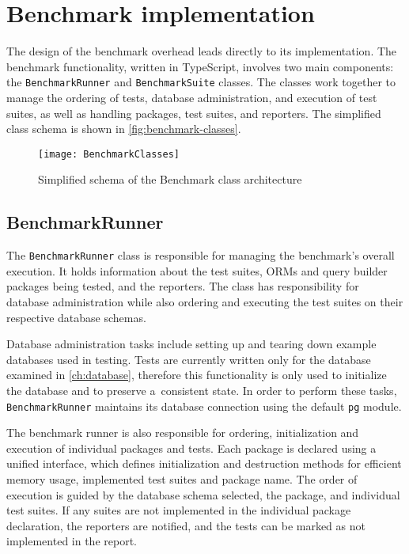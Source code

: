 \chapter{Benchmark implementation}\label{ch:BenchmarkImplement}

The design of the benchmark overhead leads directly to its implementation. The
benchmark functionality, written in TypeScript, involves two main components:
the \texttt{BenchmarkRunner} and \texttt{BenchmarkSuite} classes. The classes
work together to manage the ordering of tests, database administration, and
execution of test suites, as well as handling packages, test suites, and
reporters. The simplified class schema is shown in \autoref{fig:benchmark-classes}.

\begin{figure}[hp]
    \caption{Simplified schema of the Benchmark class architecture}
    \centering
    \label{fig:benchmark-classes}
    \texttt{[image: BenchmarkClasses]}
\end{figure}

\section{BenchmarkRunner}

The \texttt{BenchmarkRunner} class is responsible for managing the benchmark’s
overall execution. It holds information about the test suites, ORMs and query
builder packages being tested, and the reporters. The class has responsibility
for database administration while also ordering and executing the test suites on
their respective database schemas.

Database administration tasks include setting up and tearing down example
databases used in testing. Tests are currently written only for the database
examined in \autoref{ch:database}, therefore this functionality is only used to
initialize the database and to preserve a~consistent state. In order to perform
these tasks, \texttt{BenchmarkRunner} maintains its database connection using
the default \texttt{pg} module.

The benchmark runner is also responsible for ordering, initialization and
execution of individual packages and tests. Each package is declared using a
unified interface, which defines initialization and destruction methods for
efficient memory usage, implemented test suites and package name. The order of
execution is guided by the database schema selected, the package, and
individual test suites. If any suites are not implemented in the individual
package declaration, the reporters are notified, and the tests can be marked as
not implemented in the report.

